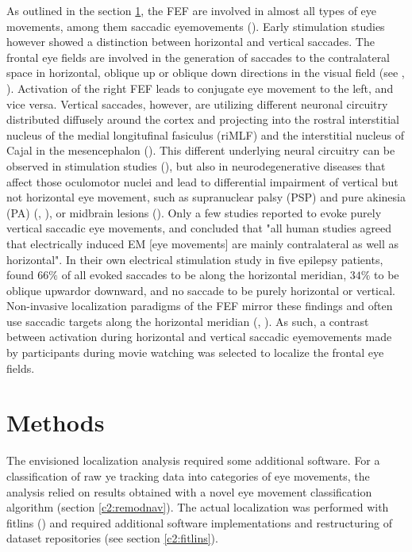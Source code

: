 \documentclass[a4paper, 12pt]{scrreprt}
\begin{document}
As outlined in the section \ref{}, the FEF are involved in almost all types of eye movements, among them saccadic eyemovements (\cite{leichnetz1988higher}). Early stimulation studies however showed a distinction between horizontal and vertical saccades. The frontal eye fields are involved in the generation of saccades to the contralateral space in horizontal, oblique up or oblique down directions in the visual field (see \textcite{bruce1985primate}, \textcite{blanke2003direction}). Activation of the right FEF leads to conjugate eye movement to the left, and vice versa. Vertical saccades, however, are utilizing different neuronal circuitry distributed diffusely around the cortex and projecting into the rostral interstitial nucleus of the medial longitufinal fasiculus (riMLF) and the interstitial nucleus of Cajal in the mesencephalon (\cite{FUKUSHIMA1991159}). This different underlying neural circuitry can be observed in stimulation studies (\cite{blanke2003direction}), but also in neurodegenerative diseases that affect those oculomotor nuclei and lead to differential impairment of vertical but not horizontal eye movement, such as supranuclear palsy (PSP) and pure akinesia (PA) (\cite{rottach1996dynamic}, \cite{riley1994syndrome}), or midbrain lesions (\cite{ranalli1988palsy}). Only a few studies reported to evoke purely vertical saccadic eye movements, and \textcite{blanke2003direction} concluded that "all human studies agreed that electrically induced EM [eye movements] are mainly contralateral as well as horizontal". In their own electrical stimulation study in five epilepsy patients, \textcite{blanke2003direction} found $66\%$ of all evoked saccades to be along the horizontal meridian, $34\%$ to be oblique upwardor downward, and no saccade to be purely horizontal or vertical. Non-invasive localization paradigms of the FEF mirror these findings and often use saccadic targets along the horizontal meridian (\cite{connolly2002human}, \cite{alkan2011differentiation}).
As such, a contrast between activation during horizontal and vertical saccadic eyemovements made by participants during movie watching was selected to localize the frontal eye fields.


\section{Methods}
The envisioned localization analysis required some additional software. For a classification of raw ye tracking data into categories of eye movements, the analysis relied on results obtained with a novel eye movement classification algorithm (section \ref{c2:remodnav}). The actual localization was performed with fitlins (\cite{markiewicz_christopher_j_2019_2555453}) and required additional software implementations and restructuring of dataset repositories (see section \ref{c2:fitlins}).
\end{document}
